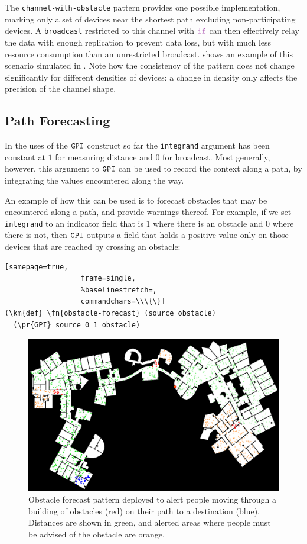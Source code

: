 \documentclass[12pt,a4paper,twoside,openright]{book}
\begin{document}
The {\tt channel-with-obstacle} pattern provides one possible implementation, marking only a set of devices near the shortest path excluding non-participating devices.
%
A {\tt broadcast} restricted to this channel with $\ifN$ can then effectively relay the data with enough replication to prevent data loss, but with much less resource consumption than an unrestricted broadcast.
%
 shows an example of this scenario simulated in \alchemist{} \cite{alchemist-jos2013}.
%
Note how the consistency of the pattern does not change significantly for different densities of devices: a change in density only affects the precision of the channel shape.

\subsection{Path Forecasting}

In the uses of the $\texttt{GPI}$ construct so far the {\tt integrand} argument has been constant at $1$ for measuring distance and $0$ for broadcast.
%
Most generally, however, this argument to $\texttt{GPI}$ can be used to record the context along a path, by integrating the values encountered along the way.

An example of how this can be used is to forecast obstacles that may be encountered along a path, and provide warnings thereof.  
%
For example, if we set {\tt integrand} to an indicator field that is $1$ where there is an obstacle and $0$ where there is not, then $\texttt{GPI}$ outputs a field that holds a positive value only on those devices that are reached by crossing an obstacle:
\begin{Verbatim}[samepage=true,
                  frame=single,
                  %baselinestretch=,
                  commandchars=\\\{\}]
(\km{def} \fn{obstacle-forecast} (source obstacle)
  (\pr{GPI} source 0 1 obstacle)
\end{Verbatim}

\begin{figure}
\centering
\includegraphics[width=\columnwidth]{img/shots-5-mit}
\caption[Indoor obstacle forecast]{Obstacle forecast pattern deployed to alert people moving through a building of obstacles (red) on their path to a destination (blue).
%
Distances are shown in green, and alerted areas where people must be advised of the obstacle are orange.}
\label{f:sector}
\end{figure}
\end{document}
